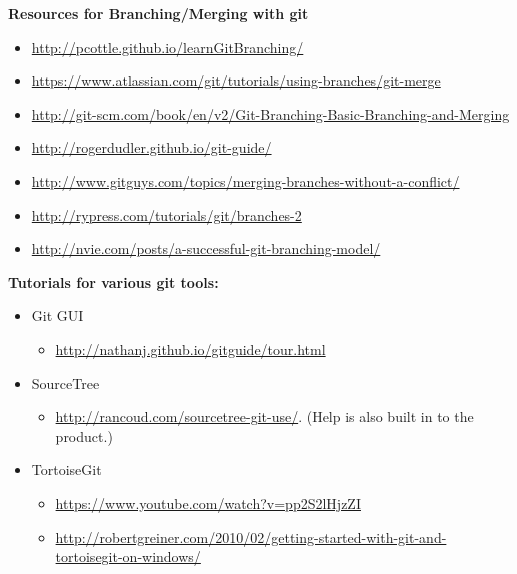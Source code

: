 \documentclass[paper=letter, fontsize=11pt]{scrartcl} %
\begin{document}
    \textbf{Resources for Branching/Merging with git}
    \begin{itemize}[noitemsep]
        \item \url{http://pcottle.github.io/learnGitBranching/}
        \item \url{https://www.atlassian.com/git/tutorials/using-branches/git-merge}
        \item \url{http://git-scm.com/book/en/v2/Git-Branching-Basic-Branching-and-Merging}
        \item \url{http://rogerdudler.github.io/git-guide/}
        \item \url{http://www.gitguys.com/topics/merging-branches-without-a-conflict/}
        \item \url{http://rypress.com/tutorials/git/branches-2}
        \item \url{http://nvie.com/posts/a-successful-git-branching-model/}
    \end{itemize}


    \textbf{Tutorials for various git tools:}
    \begin{itemize}[noitemsep]
        \item Git GUI
        \begin{itemize}
            \item \url{http://nathanj.github.io/gitguide/tour.html}
        \end{itemize}
        \item SourceTree
        \begin{itemize}
            \item \url{http://rancoud.com/sourcetree-git-use/}. (Help is also built in to the product.)
        \end{itemize}
        \item TortoiseGit
        \begin{itemize}
            \item \url{https://www.youtube.com/watch?v=pp2S2lHjzZI}
            \item \url{http://robertgreiner.com/2010/02/getting-started-with-git-and-tortoisegit-on-windows/}
        \end{itemize}
    \end{itemize}

    
\end{document}
